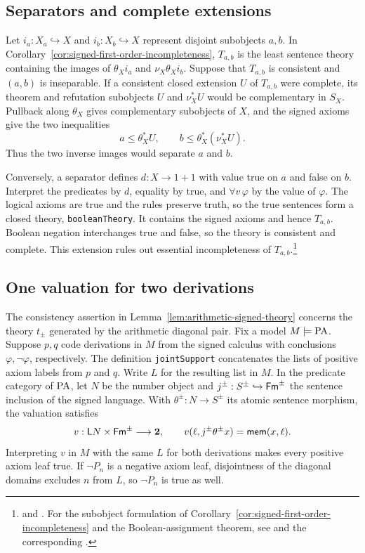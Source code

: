 \subsection{Separators and complete extensions}

Let $i_a:X_a\hookrightarrow X$ and $i_b:X_b\hookrightarrow X$ represent
disjoint subobjects $a,b$. In Corollary~\ref{cor:signed-first-order-incompleteness},
$T_{a,b}$ is the least sentence theory containing the images of
$\theta_X i_a$ and $\nu_X\theta_X i_b$. Suppose that $T_{a,b}$ is consistent and $(a,b)$ is inseparable.
If a consistent closed extension $U$ of $T_{a,b}$ were complete, its
theorem and refutation subobjects $U$ and $\nu_X^*U$ would be
complementary in $S_X$. Pullback along $\theta_X$ gives complementary
subobjects of $X$, and the signed axioms give the two inequalities
\[
   a\leq\theta_X^*U,\qquad b\leq\theta_X^*(\nu_X^*U).
\]
Thus the two inverse images would separate $a$ and $b$.

Conversely, a separator defines $d:X\to 1+1$ with value true on $a$
and false on $b$. Interpret the predicates by $d$, equality by true,
and $\forall v\,\varphi$ by the value of $\varphi$. The logical axioms
are true and the rules preserve truth, so the true sentences form a
closed theory, \texttt{booleanTheory}. It contains the signed axioms
and hence $T_{a,b}$. Boolean negation interchanges true and false, so
the theory is consistent and complete. This extension rules out
essential incompleteness of $T_{a,b}$.\footnote{
and .
For the subobject formulation of Corollary~\ref{cor:signed-first-order-incompleteness}
and the Boolean-assignment theorem, see \CEIregistration{} and the corresponding
.}

\subsection{One valuation for two derivations}

The consistency assertion in Lemma~\ref{lem:arithmetic-signed-theory}
concerns the theory $t_{\pm}$ generated by the arithmetic diagonal pair. Fix a
model $M\models\mathrm{PA}$. Suppose $p,q$ code derivations in $M$ from the
signed calculus with conclusions $\varphi,\neg\varphi$, respectively.
The definition \texttt{jointSupport} concatenates the lists of positive
axiom labels from $p$ and $q$. Write $L$ for the resulting list in $M$.
In the predicate category of $\mathrm{PA}$, let $N$ be the number object and
$j^{\pm}:S^{\pm}\hookrightarrow\mathsf{Fm}^{\pm}$ the sentence inclusion of
the signed language. With $\theta^{\pm}:N\to S^{\pm}$ its atomic
sentence morphism, the valuation satisfies
\[
  v:\mathsf L N\times\mathsf{Fm}^{\pm}\longrightarrow\mathbf 2,
  \qquad v(\ell,j^{\pm}\theta^{\pm}x)=\mathsf{mem}(x,\ell).
\]
Interpreting $v$ in $M$ with the same $L$ for both derivations
makes every positive axiom leaf true. If $\neg P_n$ is a negative
axiom leaf, disjointness of the diagonal domains excludes $n$ from $L$,
so $\neg P_n$ is true as well.

